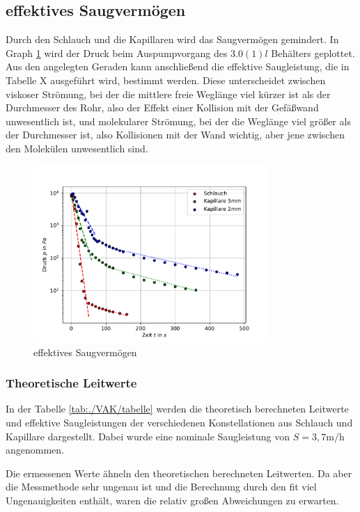 \documentclass[11pt, a4paper]{article}
\begin{document}
    \subsection{effektives Saugvermögen}

    Durch den Schlauch und die Kapillaren wird das Saugvermögen gemindert. In Graph \ref{fig:effSaug} wird der Druck beim Auspumpvorgang des $3.0(1) l$ Behälters geplottet. Aus den angelegten Geraden kann anschließend die effektive Saugleistung, die in Tabelle X ausgeführt wird, bestimmt werden. Diese unterscheidet zwischen viskoser Strömung, bei der die mittlere freie Weglänge viel kürzer ist als der Durchmesser des Rohr, also der Effekt einer Kollision mit der Gefäßwand unwesentlich ist, und molekularer Strömung, bei der die Weglänge viel größer als der Durchmesser ist, also Kollisionen mit der Wand wichtig, aber jene zwischen den Molekülen unwesentlich sind.

    \begin{figure}[h]
        \centering
        \includegraphics[width=0.8\textwidth]{Saugver.pdf}
        \caption{effektives Saugvermögen}
        \label{fig:effSaug}
    \end{figure}

    

    

    \subsubsection{Theoretische Leitwerte}
    In der Tabelle \ref{tab:./VAK/tabelle} werden die theoretisch berechneten Leitwerte und effektive Saugleistungen der verschiedenen Konstellationen aus Schlauch und Kapillare dargestellt. Dabei wurde eine nominale Saugleistung von $S = 3,7 \si{\meter\per\hour}$ angenommen.
    
    Die ermessenen Werte ähneln den theoretischen berechneten Leitwerten. Da aber die Messmethode sehr ungenau ist und die Berechnung durch den fit viel Ungenauigkeiten enthält, waren die relativ großen Abweichungen zu erwarten.
\end{document}
